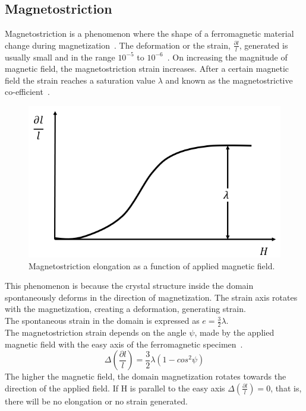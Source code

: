 \documentclass[12pt,a4paper,bold]{thesis}
\theoremstyle{thm}
\theoremstyle{definition}
\begin{document}
\subsection{Magnetostriction}
\indent \indent \indent Magnetostriction is a phenomenon where the shape of a ferromagnetic material change during magnetization~\cite{RefWorks:164}. The deformation or the strain, $ \frac{\partial l}{l}$, generated is usually small and in the range $10^{-5}$ to $10^{-6}$~\cite{chika97}. On increasing the magnitude of magnetic field, the magnetostriction strain increases. After a certain magnetic field the strain reaches a saturation value $\lambda$ and known as the magnetostrictive co-efficient~\cite{chika97, RefWorks:178}.
\begin{figure}[H]
	\centering
   \includegraphics[scale=0.56]{Images/24.png} 
   \caption{Magnetostriction elongation as a function of applied magnetic field.}
\end{figure}
\indent \indent This phenomenon is because the crystal structure inside the domain spontaneously deforms in the direction of magnetization. The strain axis rotates with the magnetization, creating a deformation, generating strain.\\
\indent The spontaneous strain in the domain is expressed as $e=\frac{3}{2} \lambda$.\\
The magnetostriction strain depends on the angle $\psi$, made by the applied magnetic field with the easy axis of the ferromagnetic specimen~\cite{chika97}.
\[\Delta(\frac{\partial l}{l})=\frac{3}{2}\lambda(1-cos^2\psi)\]
The higher the magnetic field, the domain magnetization rotates towards the direction of the applied field. If H is parallel to the easy axis $\Delta(\frac{\partial l}{l})=0$, that is, there will be no elongation or no strain generated.
\end{document}
